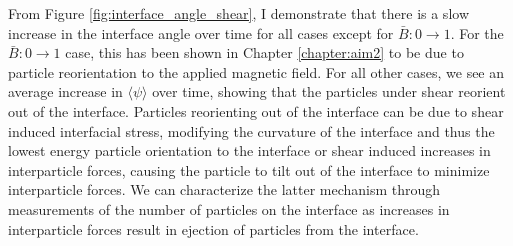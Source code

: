 From Figure \ref{fig:interface_angle_shear}, I demonstrate that there is a slow increase in the interface angle over time for all cases
except for $\bar{B}: 0 \to 1$. For the $\bar{B}: 0 \to 1$ case, this has been shown in Chapter \ref{chapter:aim2} to be due to particle
reorientation to the applied magnetic field. For all other cases, we see an average increase in $\langle \psi \rangle$ over time, showing
that the particles under shear reorient out of the interface. Particles reorienting out of the interface can be due to shear induced interfacial 
stress, modifying the curvature of the interface and thus the lowest energy particle orientation to the interface or shear induced increases in
interparticle forces, causing the particle to tilt out of the interface to minimize interparticle forces. We can characterize the latter 
mechanism through measurements of the number of particles on the interface as increases in interparticle forces result in ejection of
particles from the interface. 




